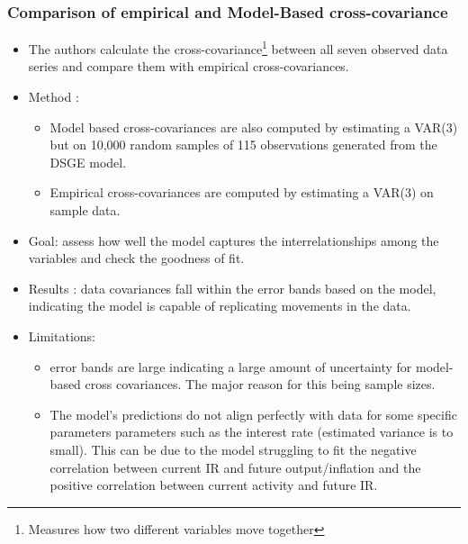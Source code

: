 \documentclass{article}
\begin{document}
\subsubsection{Comparison of empirical and Model-Based cross-covariance}
\begin{itemize}
    \item The authors calculate the cross-covariance\footnote{Measures how two different variables move together} between all seven observed data series and compare them with empirical cross-covariances. 
    \item Method : 
    \begin{itemize}
         \item Model based cross-covariances are also computed by estimating a VAR(3) but on 10,000 random samples of 115 observations generated from the DSGE model. 
        \item Empirical cross-covariances are computed by estimating a VAR(3) on sample data.
    \end{itemize}
    \item Goal: assess how well the model captures the interrelationships among the variables and check the goodness of fit. 
    \item Results : data covariances fall within the error bands based on the model, indicating the model is capable of replicating movements in the data. 
    \item Limitations: 
    \begin{itemize}
        \item error bands are large indicating a large amount of uncertainty for model-based cross covariances. The major reason for this being sample sizes.
        \item The model's predictions do not align perfectly with data for some specific parameters parameters such as the interest rate (estimated variance is to small). This can be due to the model struggling to fit the negative correlation between current IR and future output/inflation and the positive correlation between current activity and future IR. 
    \end{itemize}
\end{itemize}
\end{document}
